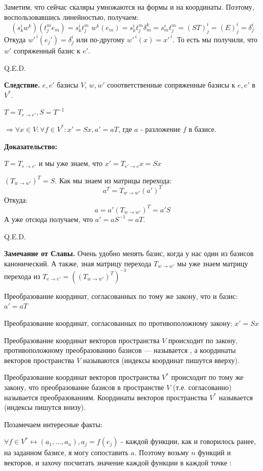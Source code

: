 Заметим, что сейчас скаляры умножаются на формы и на координаты. Поэтому, воспользовавшись линейностью, получаем:
$$(s^i_k w^k)(t_j^me_m) = s^i_k t^m_j \, \,w^k(e_m) = s^i_k t^m_j \delta_m^k =s^i_mt^m_j= (ST)^i_j = (E)^i_j  = \delta^i_j$$
Откуда $w'^{\, i}(e_j')=\delta^i_j$ или по-другому $w'^{\, i}(x) =x'^{\,i}$. То есть мы получили, что $w'$ сопряженный базис к $e'$.

\hfill Q.E.D.

\textbf{Следствие.} $e,e'$ базисы $V$, $w,w'$ сооответственные сопряженные базисы к $e,e'$ в $V^*$.

$T = T_{e\rightarrow e'}, S = T^{-1}$

$ \Rightarrow \forall x \in V: \forall f \in V^*:x' = Sx, a' = aT$, где $a$ - разложение $f$ в базисе.

\textbf{Доказательство:}    

$T=T_{e\rightarrow e'}$ и мы уже знаем, что $x' = T_{e'\rightarrow e}x = Sx$ 

$(T_{w\rightarrow w'})^T = S$. Как мы знаем из матрицы перехода:
$$a^T = T_{w\rightarrow w'}(a')^T$$ 
Откуда:
$$a = a'(T_{w\rightarrow w'})^T = a'S$$
А уже отсюда получаем, что $a' = aS^{-1} = aT$.

\hfill Q.E.D.

\textbf{Замечание от Славы.} Очень удобно менять базис, когда у нас один из базисов канонический. А также, зная матрицу перехода $T_{w\rightarrow w'}$ мы уже знаем матрицу перехода из $T_{e\rightarrow e'} =((T_{w\rightarrow w'})^T)^{-1} $


Преобразование координат, согласованных по тому же закону, что и базис:
$a' =a T$

Преобразование координат, согласованных по противоположному закону:
$x' = Sx$

 Преобразование координат векторов пространства $V$ происходит по закону, противоположному преобразованию базисов --- называется , а координаты векторов пространства $V$ называются  (индексы координат пишутся вверху).

 Преобразование координат векторов пространства $V^*$ происходит по тому же закону, что преобразование базисов в пространстве $V$ (т.е. согласованно) называется  преобразованиям.
Координаты векторов пространства $V^* $ называется  (индексы пишутся внизу).

Позамечаем интересные факты:

$\forall f \in V^* \leftrightarrow (a_1,\ldots, a_n), a_j = f(e_j)$ - каждой функции, как и говорилось ранее, на заданном базисе, я могу сопоставить $a$. Поэтому возьму $n$ функций и векторов, и захочу посчитать значение каждой функции в каждой точке : 

